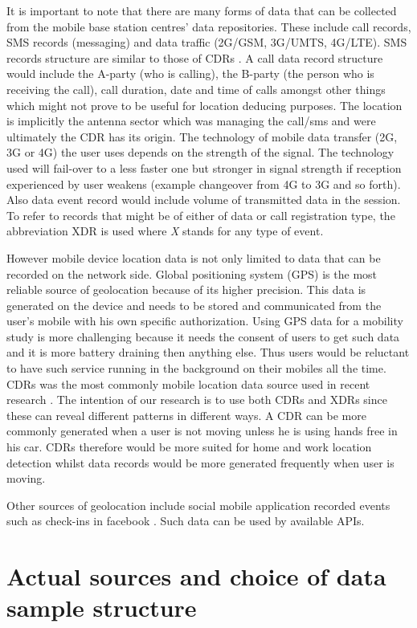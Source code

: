\documentclass[12pt, a4paper]{report}
\theoremstyle{definition}
\theoremstyle{definition}%
\theoremstyle{definition}%
\theoremstyle{definition}%
\theoremstyle{definition}%
\theoremstyle{definition}%
\begin{document}
It is important to note that there are many forms of data that can be collected from the mobile base station centres' data repositories. These include call records, SMS records (messaging) and data traffic (2G/GSM, 3G/UMTS, 4G/LTE). SMS records structure are similar to those of CDRs \cite{Calabrese2013}. A call data record structure would include the A-party (who is calling), the B-party (the person who is receiving the call), call duration, date and time of calls amongst other things which might not prove to be useful for location deducing purposes. The location is implicitly the antenna sector which was managing the call/sms and were ultimately the CDR has its origin. The technology of mobile data transfer (2G, 3G or 4G) the user uses depends on the strength of the signal. The technology used will fail-over to a less faster one but stronger in signal strength if reception experienced by user weakens (example changeover from 4G to 3G and so forth). Also data event record would include volume of transmitted data in the session. To refer to records that might be of either of data or call registration type, the abbreviation XDR is used where \textit{X} stands for any type of event.

However mobile device location data is not only limited to data that can be recorded on the network side. Global positioning system (GPS) is the most reliable source of geolocation because of its higher precision. This data is generated on the device and needs to be stored and communicated from the user's mobile with his own specific authorization. Using GPS data for a mobility study is more challenging because it needs the consent of users to get such data and it is more battery draining then anything else. Thus users would be reluctant to have such service running in the background on their mobiles all the time. CDRs was the most commonly mobile location data source used in recent research \cite{Hoteit2016}. The intention of our research is to use both CDRs and XDRs since these can reveal different patterns in different ways. A CDR can be more commonly generated when a user is not moving unless he is using hands free in his car. CDRs therefore would be more suited for home and work location detection whilst data records would be more generated frequently when user is moving.

Other sources of geolocation include social mobile application recorded events such as check-ins in facebook \cite{Hoteit2014}. Such data can be used by available APIs.

\section{Actual sources and choice of data sample structure} \label{methodoloy_sources}
\end{document}

